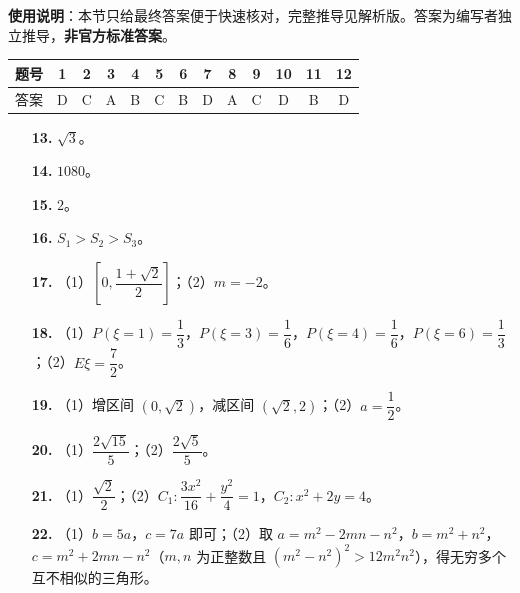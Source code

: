 
\begin{gknotice}
\textbf{使用说明}：本节只给最终答案便于快速核对，完整推导见解析版。答案为编写者独立推导，\textbf{非官方标准答案}。
\end{gknotice}

\begin{center}\begin{tabular}{ccccccccccccc}
\toprule
题号 & 1 & 2 & 3 & 4 & 5 & 6 & 7 & 8 & 9 & 10 & 11 & 12 \\
\midrule
答案 & D & C & A & B & C & B & D & A & C & D & B & D \\
\bottomrule
\end{tabular}\end{center}

\begin{itemize}[leftmargin=2.6em]
  \item[\textbf{13.}] $\sqrt3$。
  \item[\textbf{14.}] $1080$。
  \item[\textbf{15.}] $2$。
  \item[\textbf{16.}] $S_1>S_2>S_3$。
\end{itemize}

\begin{itemize}[leftmargin=2.6em]
  \item[\textbf{17.}] （1）$\left[0,\dfrac{1+\sqrt2}{2}\right]$；（2）$m=-2$。
  \item[\textbf{18.}] （1）$P(\xi=1)=\dfrac13$，$P(\xi=3)=\dfrac16$，$P(\xi=4)=\dfrac16$，$P(\xi=6)=\dfrac13$；（2）$E\xi=\dfrac72$。
  \item[\textbf{19.}] （1）增区间 $(0,\sqrt2)$，减区间 $(\sqrt2,2)$；（2）$a=\dfrac12$。
  \item[\textbf{20.}] （1）$\dfrac{2\sqrt{15}}5$；（2）$\dfrac{2\sqrt5}5$。
  \item[\textbf{21.}] （1）$\dfrac{\sqrt2}{2}$；（2）$C_1:\dfrac{3x^2}{16}+\dfrac{y^2}4=1$，$C_2:x^2+2y=4$。
  \item[\textbf{22.}] （1）$b=5a$，$c=7a$ 即可；（2）取 $a=m^2-2mn-n^2$，$b=m^2+n^2$，$c=m^2+2mn-n^2$（$m,n$ 为正整数且 $(m^2-n^2)^2>12m^2n^2$），得无穷多个互不相似的三角形。
\end{itemize}
